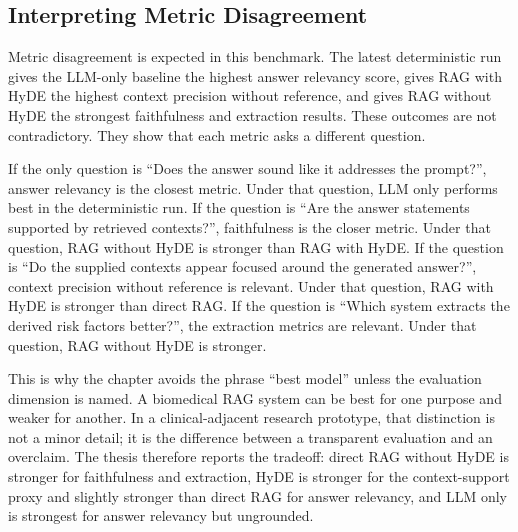 \subsection{Interpreting Metric Disagreement}

Metric disagreement is expected in this benchmark. The latest deterministic run gives the LLM-only baseline the highest answer relevancy score, gives RAG with HyDE the highest context precision without reference, and gives RAG without HyDE the strongest faithfulness and extraction results. These outcomes are not contradictory. They show that each metric asks a different question.

If the only question is ``Does the answer sound like it addresses the prompt?'', answer relevancy is the closest metric. Under that question, LLM only performs best in the deterministic run. If the question is ``Are the answer statements supported by retrieved contexts?'', faithfulness is the closer metric. Under that question, RAG without HyDE is stronger than RAG with HyDE. If the question is ``Do the supplied contexts appear focused around the generated answer?'', context precision without reference is relevant. Under that question, RAG with HyDE is stronger than direct RAG. If the question is ``Which system extracts the derived risk factors better?'', the extraction metrics are relevant. Under that question, RAG without HyDE is stronger.

This is why the chapter avoids the phrase ``best model'' unless the evaluation dimension is named. A biomedical RAG system can be best for one purpose and weaker for another. In a clinical-adjacent research prototype, that distinction is not a minor detail; it is the difference between a transparent evaluation and an overclaim. The thesis therefore reports the tradeoff: direct RAG without HyDE is stronger for faithfulness and extraction, HyDE is stronger for the context-support proxy and slightly stronger than direct RAG for answer relevancy, and LLM only is strongest for answer relevancy but ungrounded.

